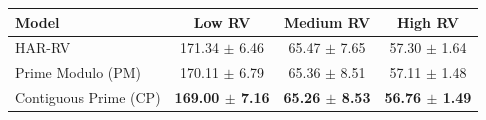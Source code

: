 \begin{tabular}{@{}lccc@{}}
\toprule
Model & Low RV & Medium RV & High RV \\
\midrule
HAR-RV & 171.34 $\pm$ 6.46 & 65.47 $\pm$ 7.65 & 57.30 $\pm$ 1.64 \\
Prime Modulo (PM) & 170.11 $\pm$ 6.79 & 65.36 $\pm$ 8.51 & 57.11 $\pm$ 1.48 \\
Contiguous Prime (CP) & \textbf{169.00 $\pm$ 7.16} & \textbf{65.26 $\pm$ 8.53} & \textbf{56.76 $\pm$ 1.49} \\
\bottomrule
\end{tabular}
